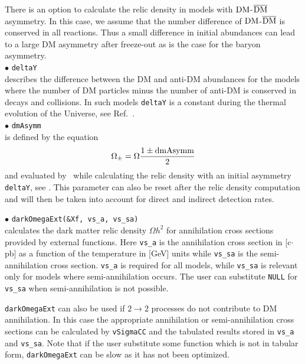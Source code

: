 \documentclass[12pt,a4paper]{article}
\begin{document}
There is an option to calculate the relic density in  models with  ${\rm DM}$-$\overline{\rm DM}$ asymmetry.  
In this case, we assume that the  number difference of ${\rm DM}$-$\overline{\rm DM}$ is conserved in all reactions.
Thus a small difference in initial abundances can lead to a  large DM asymmetry after freeze-out as is the case for the  baryon asymmetry.\\

\noindent
$\bullet$ \verb|deltaY|\\
describes the difference between the DM and anti-DM abundances for the
models where the number of DM particles minus the number of anti-DM is conserved in
decays and collisions. In such models \verb|deltaY| is a
constant during the thermal evolution of the Universe,   see Ref.~\cite{Belanger:2013oya}.\\
\noindent
$\bullet$ \verb|dmAsymm|\\
is defined by the equation 
$$ \Omega_{\pm} = \Omega \frac{1 \pm {\rm dmAsymm}}{2}$$
and evaluated  by \micro\ while calculating the relic density  with an
initial asymmetry \verb|deltaY|, see \cite{Belanger:2013oya}. 
This parameter can also be reset  after the relic density 
computation and will then be taken into account for direct and 
indirect detection rates.

\noindent
$\bullet$ \verb|darkOmegaExt(&Xf, vs_a, vs_sa)|\\
calculates the dark matter relic density $\Omega h^2$  
for  annihilation cross sections  provided by  external 
functions. Here  \verb|vs_a| is the  annihilation cross section in [c$\cdot$pb] as 
a function of the temperature in [GeV] units while  \verb|vs_sa| 
is the semi-annihilation cross section.  \verb|vs_a| is required for all models, 
while \verb|vs_sa| is relevant only for models where semi-annihilation occurs.  The user 
can  substitute {\tt NULL} for \verb|vs_sa| when semi-annihilation is not possible.
 
 {\tt darkOmegaExt}   can also be used 
if $ 2 \to 2$ processes do not contribute  to DM  annihilation. In this case the appropriate annihilation or  semi-annihilation
cross sections can be calculated by {\tt vSigmaCC} and the tabulated results stored in \verb|vs_a| and \verb|vs_sa|. Note that if the user substitute some function which is not in tabular form, {\tt darkOmegaExt} can be  slow as it has not been optimized. 
\end{document}
